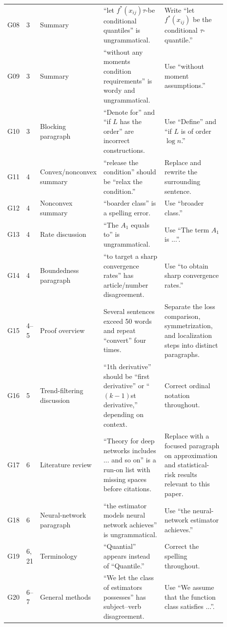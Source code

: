 \documentclass[11pt]{article}
\begin{document}
\begin{landscape}
\begin{longtable}{L{0.045\linewidth}L{0.065\linewidth}L{0.16\linewidth}L{0.31\linewidth}L{0.31\linewidth}}
G08 & 3 & Summary & “let $f^*(x_{ij})\tau$-be conditional quantiles” is ungrammatical. & Write “let $f^*(x_{ij})$ be the conditional $\tau$-quantile.”\\
G09 & 3 & Summary & “without any moments condition requirements” is wordy and ungrammatical. & Use “without moment assumptions.”\\
G10 & 3 & Blocking paragraph & “Denote for” and “if $L$ has the order” are incorrect constructions. & Use “Define” and “if $L$ is of order $\log n$.”\\
G11 & 4 & Convex/nonconvex summary & “release the condition” should be “relax the condition.” & Replace and rewrite the surrounding sentence.\\
G12 & 4 & Nonconvex summary & “boarder class” is a spelling error. & Use “broader class.”\\
G13 & 4 & Rate discussion & “The $A_1$ equals to” is ungrammatical. & Use “The term $A_1$ is ...”.\\
G14 & 4 & Boundedness paragraph & “to target a sharp convergence rates” has article/number disagreement. & Use “to obtain sharp convergence rates.”\\
G15 & 4--5 & Proof overview & Several sentences exceed 50 words and repeat “convert” four times. & Separate the loss comparison, symmetrization, and localization steps into distinct paragraphs.\\
G16 & 5 & Trend-filtering discussion & “1th derivative” should be “first derivative” or “$(k-1)$st derivative,” depending on context. & Correct ordinal notation throughout.\\
G17 & 6 & Literature review & “Theory for deep networks includes ... and so on” is a run-on list with missing spaces before citations. & Replace with a focused paragraph on approximation and statistical-risk results relevant to this paper.\\
G18 & 6 & Neural-network paragraph & “the estimator models neural network achieves” is ungrammatical. & Use “the neural-network estimator achieves.”\\
G19 & 6, 21 & Terminology & “Quantial” appears instead of “Quantile.” & Correct the spelling throughout.\\
G20 & 6--7 & General methods & “We let the class of estimators possesses” has subject--verb disagreement. & Use “We assume that the function class satisfies ...”.\\

\end{longtable}
\end{landscape}
\end{document}
